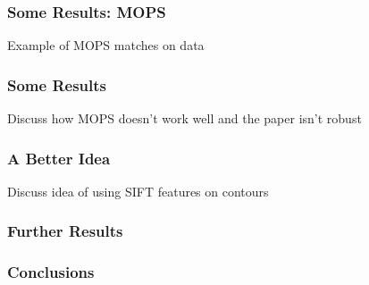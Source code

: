 \documentclass[xcolor=x11names,compress,t]{beamer}
\renewcommand{\(}{\begin{columns}}
\renewcommand{\)}{\end{columns}}
\newcommand{\<}[1]{\begin{column}{#1}}
\renewcommand{\>}{\end{column}}
\begin{document}
\begin{frame}
  \frametitle{Some Results: MOPS}
  Example of MOPS matches on data
\end{frame}

\begin{frame}
  \frametitle{Some Results}
  Discuss how MOPS doesn't work well and the paper isn't robust
\end{frame}

\begin{frame}
  \frametitle{A Better Idea}
  Discuss idea of using SIFT features on contours
\end{frame}

\begin{frame}
  \frametitle{Further Results}
  
\end{frame}

\begin{frame}
  \frametitle{Conclusions}
  
\end{frame}

\end{document}
